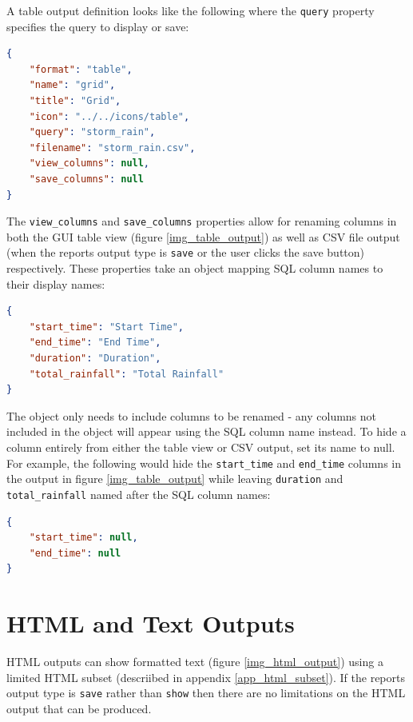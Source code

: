 \documentclass[a4paper,10pt]{book}
\begin{document}
A table output definition looks like the following where the \verb|query| property specifies the query to display or save:
\begin{lstlisting}[language=json]
{
	"format": "table",
	"name": "grid",
	"title": "Grid",
	"icon": "../../icons/table",
	"query": "storm_rain",
	"filename": "storm_rain.csv",
	"view_columns": null,
	"save_columns": null        
}
\end{lstlisting}



The \verb|view_columns| and \verb|save_columns| properties allow for renaming columns in both the GUI table view (figure \ref{img_table_output}) as well as CSV file output (when the reports output type is \verb|save| or the user clicks the save button) respectively. These properties take an object mapping SQL column names to their display names:
\begin{lstlisting}[language=json]
{
	"start_time": "Start Time",
	"end_time": "End Time",
	"duration": "Duration",
	"total_rainfall": "Total Rainfall"        
}
\end{lstlisting}

The object only needs to include columns to be renamed - any columns not included in the object will appear using the SQL column name instead. To hide a column entirely from either the table view or CSV output, set its name to null. For example, the following would hide the \verb|start_time| and \verb|end_time| columns in the output in figure \ref{img_table_output} while leaving \verb|duration| and \verb|total_rainfall| named after the SQL column names:
\begin{lstlisting}[language=json]
{
	"start_time": null,
	"end_time": null
}
\end{lstlisting}


\section{HTML  and Text Outputs}
HTML outputs can show formatted text (figure \ref{img_html_output}) using a limited HTML subset (descriibed in appendix \ref{app_html_subset}). If the reports output type is \verb|save| rather than \verb|show| then there are no limitations on the HTML output that can be produced.
\end{document}
